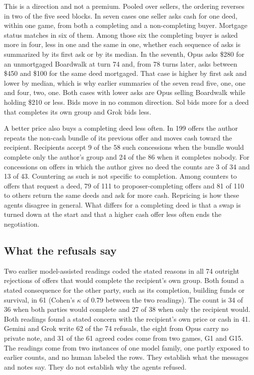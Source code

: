 \documentclass[11pt,letterpaper]{article}
\begin{document}
This is a direction and not a premium. Pooled over sellers, the ordering reverses in two of the five seed blocks. In seven cases one seller asks cash for one deed, within one game, from both a completing and a non-completing buyer. Mortgage status matches in six of them. Among those six the completing buyer is asked more in four, less in one and the same in one, whether each sequence of asks is summarized by its first ask or by its median. In the seventh, Opus asks \$280 for an unmortgaged Boardwalk at turn 74 and, from 78 turns later, asks between \$450 and \$100 for the same deed mortgaged. That case is higher by first ask and lower by median, which is why earlier summaries of the seven read five, one, one and four, two, one. Both cases with lower asks are Opus selling Boardwalk while holding \$210 or less. Bids move in no common direction. Sol bids more for a deed that completes its own group and Grok bids less.

A better price also buys a completing deed less often. In 199 offers the author repeats the non-cash bundle of its previous offer and moves cash toward the recipient. Recipients accept 9 of the 58 such concessions when the bundle would complete only the author's group and 24 of the 86 when it completes nobody. For concessions on offers in which the author gives no deed the counts are 3 of 34 and 13 of 43. Countering as such is not specific to completion. Among counters to offers that request a deed, 79 of 111 to proposer-completing offers and 81 of 110 to others return the same deeds and ask for more cash. Repricing is how these agents disagree in general. What differs for a completing deed is that a swap is turned down at the start and that a higher cash offer less often ends the negotiation.

\subsection{What the refusals say}

Two earlier model-assisted readings coded the stated reasons in all 74 outright rejections of offers that would complete the recipient's own group. Both found a stated consequence for the other party, such as its completion, building funds or survival, in 61 (Cohen's $\kappa$ of 0.79 between the two readings). The count is 34 of 36 when both parties would complete and 27 of 38 when only the recipient would. Both readings found a stated concern with the recipient's own price or cash in 41. Gemini and Grok write 62 of the 74 refusals, the eight from Opus carry no private note, and 31 of the 61 agreed codes come from two games, G1 and G15. The readings come from two instances of one model family, one partly exposed to earlier counts, and no human labeled the rows. They establish what the messages and notes say. They do not establish why the agents refused.
\end{document}
